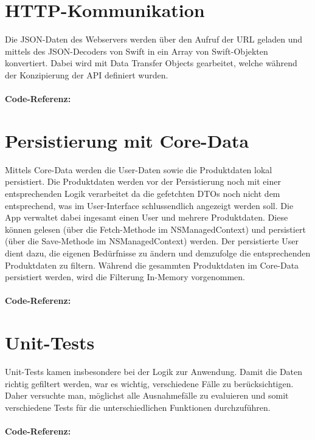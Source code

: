 \documentclass[12pt,titlepage]{article}
\begin{document}
\section*{HTTP-Kommunikation}
Die JSON-Daten des Webservers werden über den Aufruf der  URL geladen und mittels des JSON-Decoders von Swift in ein Array von Swift-Objekten konvertiert. Dabei wird mit Data Transfer Objects gearbeitet, welche während der Konzipierung der API definiert wurden.\\
\\
\textbf{Code-Referenz: }\\ 

\section*{Persistierung mit Core-Data}
Mittels Core-Data werden die User-Daten sowie die Produktdaten lokal persistiert. Die Produktdaten werden vor der Persistierung noch mit einer entsprechenden Logik verarbeitet da die gefetchten DTOs noch nicht dem entsprechend, was im User-Interface schlussendlich angezeigt werden soll. Die App verwaltet dabei ingesamt einen User und mehrere Produktdaten. Diese können gelesen (über die Fetch-Methode im NSManagedContext) und persistiert (über die Save-Methode im NSManagedContext) werden. Der persistierte User dient dazu, die eigenen Bedürfnisse zu ändern und demzufolge die entsprechenden Produktdaten zu filtern. Während die gesammten Produktdaten im Core-Data persistiert werden, wird die Filterung In-Memory vorgenommen.\\
\\
\textbf{Code-Referenz: }\\ 

\section*{Unit-Tests}
Unit-Tests kamen insbesondere bei der Logik zur Anwendung. Damit die Daten richtig gefiltert werden, war es wichtig, verschiedene Fälle zu berücksichtigen. Daher versuchte man, möglichst alle Ausnahmefälle zu evaluieren und somit verschiedene Tests für die unterschiedlichen Funktionen durchzuführen.\\
\\
\textbf{Code-Referenz: }\\ 
\end{document}
